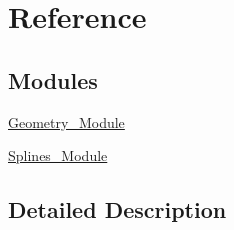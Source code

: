 \hypertarget{group___geometry___reference}{}\section{Reference}
\label{group___geometry___reference}
\subsection*{Modules}
\begin{DoxyCompactItemize}
\item 
\hyperlink{group___geometry___module}{Geometry\+\_\+\+Module}
\item 
\hyperlink{group___splines___module}{Splines\+\_\+\+Module}
\end{DoxyCompactItemize}


\subsection{Detailed Description}
